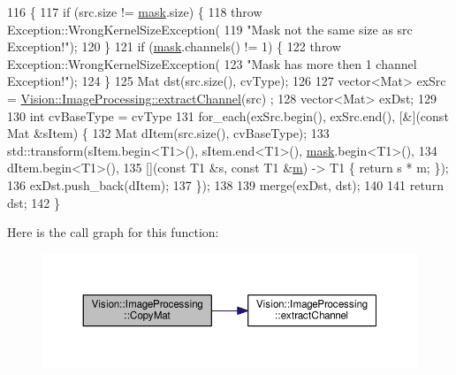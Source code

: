 \begin{DoxyCode}
116                                                                   \{
117     \textcolor{keywordflow}{if} (src.size != \hyperlink{_gen_blob_8m_a5d76cc2129e79ba1941d2cc2f53b9e8e}{mask}.size) \{
118       \textcolor{keywordflow}{throw} Exception::WrongKernelSizeException(
119           \textcolor{stringliteral}{"Mask not the same size as src Exception!"});
120     \}
121     \textcolor{keywordflow}{if} (\hyperlink{_gen_blob_8m_a5d76cc2129e79ba1941d2cc2f53b9e8e}{mask}.channels() != 1) \{
122       \textcolor{keywordflow}{throw} Exception::WrongKernelSizeException(
123           \textcolor{stringliteral}{"Mask has more then 1 channel Exception!"});
124     \}
125     Mat dst(src.size(), cvType);
126 
127     vector<Mat> exSrc = \hyperlink{class_vision_1_1_image_processing_ad5fa51caaabb8cb0fc2c15f645695a3c}{Vision::ImageProcessing::extractChannel}(src)
      ;
128     vector<Mat> exDst;
129 
130     \textcolor{keywordtype}{int} cvBaseType = cvType %
131     for\_each(exSrc.begin(), exSrc.end(), [&](\textcolor{keyword}{const} Mat &sItem) \{
132       Mat dItem(src.size(), cvBaseType);
133       std::transform(sItem.begin<T1>(), sItem.end<T1>(), \hyperlink{_gen_blob_8m_a5d76cc2129e79ba1941d2cc2f53b9e8e}{mask}.begin<T1>(),
134                      dItem.begin<T1>(),
135                      [](\textcolor{keyword}{const} T1 &s, \textcolor{keyword}{const} T1 &\hyperlink{_gen_blob_8m_ab3cd915d758008bd19d0f2428fbb354a}{m}) -> T1 \{ return s * m; \});
136       exDst.push\_back(dItem);
137     \});
138 
139     merge(exDst, dst);
140 
141     \textcolor{keywordflow}{return} dst;
142   \}
\end{DoxyCode}


Here is the call graph for this function\+:\nopagebreak
\begin{figure}[H]
\begin{center}
\leavevmode
\includegraphics[width=350pt]{class_vision_1_1_image_processing_a5a255d7f5b10bcb199e66d1e00ab9d1a_cgraph}
\end{center}
\end{figure}


\hypertarget{class_vision_1_1_image_processing_ad5fa51caaabb8cb0fc2c15f645695a3c}{}
